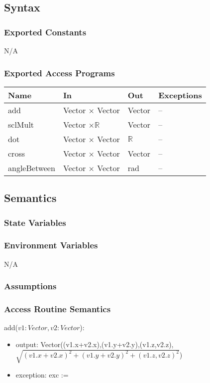 \documentclass[12pt, titlepage]{article}
\begin{document}
\subsection{Syntax}
\subsubsection{Exported Constants}
N/A
\subsubsection{Exported Access Programs}
\begin{center}
	\begin{tabular}{p{4cm} p{2cm} p{2cm} p{4cm}}
		\hline
		\textbf{Name} & \textbf{In} & \textbf{Out} & \textbf{Exceptions} \\
		\hline
		add & Vector $\times$ Vector & Vector & -- \\
		sclMult & Vector $\times \mathbb{R}$ & Vector & -- \\ 
		dot & Vector $\times$ Vector & $\mathbb{R}$ & -- \\
		cross & Vector $\times$ Vector & Vector & -- \\
		angleBetween & Vector $\times$ Vector & rad & -- \\
		\hline
	\end{tabular}
\end{center}

\subsection{Semantics}
\subsubsection{State Variables}

\subsubsection{Environment Variables}
N/A

\subsubsection{Assumptions}

\subsubsection{Access Routine Semantics}
\noindent add($v1:Vector, v2:Vector$):
\begin{itemize}
	\item output: 
	Vector((v1.x+v2.x),(v1.y+v2.y),(v1.z,v2.z), \\
	$\sqrt{(v1.x+v2.x)^2+(v1.y+v2.y)^2+(v1.z,v2.z)^2}$)
	\item exception: exc := \\
\end{itemize}
\end{document}
